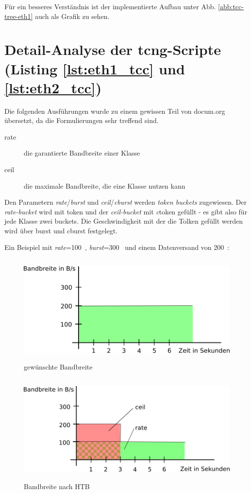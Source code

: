 Für ein besseres Verständnis ist der implementierte Aufbau unter Abb. \vref{abb:tcc-tree-eth1} auch als Grafik zu sehen.

\section*{Detail-Analyse der tcng-Scripte (Listing \vref{lst:eth1_tcc} und \vref{lst:eth2_tcc})}
Die folgenden Ausführungen wurde zu einem gewissen Teil von docum.org \citep{DOCUMHTB} übersetzt, da die Formulierungen sehr treffend sind.
\begin{description}
  \item[rate] die garantierte Bandbreite einer Klasse
  \item[ceil] die maximale Bandbreite, die eine Klasse nutzen kann
\end{description}

Den Parametern \emph{rate}/\emph{burst} und \emph{ceil}/\emph{cburst} werden {\sog}\emph{\gls{token} \glspl{bucket}} zugewiesen. Der \emph{rate-bucket} wird mit \gls{token} und der \emph{ceil-bucket} mit \emph{c}\gls{token} gefüllt - es gibt also für jede Klasse zwei \glspl{bucket}. Die Geschwindigkeit mit der die Tolken gefüllt werden wird über burst und cburst festgelegt.


Ein Beispiel mit \emph{rate}=100~{\byte\per\second}, \emph{burst}=300~{\byte} und einem Datenversand von 200~{\byte\per\second}:
\begin{figure}[htb]
  \centering
  \includegraphics[height=5.5cm]{Inhalt/Grafiken/bandbreite-gewuenscht.png}
  \caption{gewünschte Bandbreite}
  \label{fig:bandbreite-gewuenscht}
\end{figure}

\begin{figure}[htb]
  \centering
  \includegraphics[height=5.5cm]{Inhalt/Grafiken/bandbreite-nach-htb.png}
  \caption{Bandbreite nach HTB}
  \label{fig:bandbreite-nach-htb}
\end{figure}

